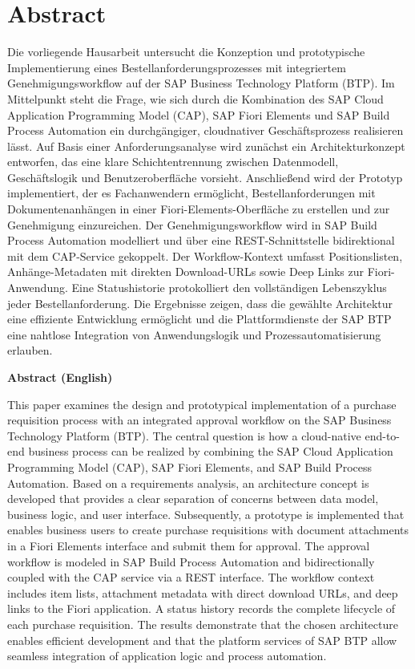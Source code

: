 \section*{Abstract}

Die vorliegende Hausarbeit untersucht die Konzeption und prototypische Implementierung eines Bestellanforderungsprozesses mit integriertem Genehmigungsworkflow auf der SAP Business Technology Platform (BTP). Im Mittelpunkt steht die Frage, wie sich durch die Kombination des SAP Cloud Application Programming Model (CAP), SAP Fiori Elements und SAP Build Process Automation ein durchgängiger, cloudnativer Geschäftsprozess realisieren lässt. Auf Basis einer Anforderungsanalyse wird zunächst ein Architekturkonzept entworfen, das eine klare Schichtentrennung zwischen Datenmodell, Geschäftslogik und Benutzeroberfläche vorsieht. Anschließend wird der Prototyp implementiert, der es Fachanwendern ermöglicht, Bestellanforderungen mit Dokumentenanhängen in einer Fiori-Elements-Oberfläche zu erstellen und zur Genehmigung einzureichen. Der Genehmigungsworkflow wird in SAP Build Process Automation modelliert und über eine REST-Schnittstelle bidirektional mit dem CAP-Service gekoppelt. Der Workflow-Kontext umfasst Positionslisten, Anhänge-Metadaten mit direkten Download-URLs sowie Deep Links zur Fiori-Anwendung. Eine Statushistorie protokolliert den vollständigen Lebenszyklus jeder Bestellanforderung. Die Ergebnisse zeigen, dass die gewählte Architektur eine effiziente Entwicklung ermöglicht und die Plattformdienste der SAP BTP eine nahtlose Integration von Anwendungslogik und Prozessautomatisierung erlauben.

\bigskip
\large{\textbf{Abstract (English)}}

\normalsize
This paper examines the design and prototypical implementation of a purchase requisition process with an integrated approval workflow on the SAP Business Technology Platform (BTP). The central question is how a cloud-native end-to-end business process can be realized by combining the SAP Cloud Application Programming Model (CAP), SAP Fiori Elements, and SAP Build Process Automation. Based on a requirements analysis, an architecture concept is developed that provides a clear separation of concerns between data model, business logic, and user interface. Subsequently, a prototype is implemented that enables business users to create purchase requisitions with document attachments in a Fiori Elements interface and submit them for approval. The approval workflow is modeled in SAP Build Process Automation and bidirectionally coupled with the CAP service via a REST interface. The workflow context includes item lists, attachment metadata with direct download URLs, and deep links to the Fiori application. A status history records the complete lifecycle of each purchase requisition. The results demonstrate that the chosen architecture enables efficient development and that the platform services of SAP BTP allow seamless integration of application logic and process automation.
